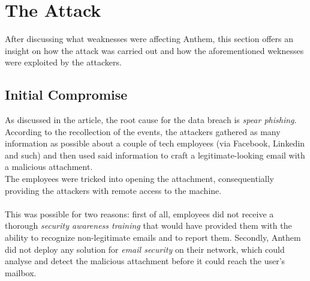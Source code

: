 \section{The Attack}
	After discussing what weaknesses were affecting Anthem, this section offers an insight on how the attack was carried out and how the aforementioned weknesses were exploited by the attackers. 
	\subsection{Initial Compromise}
	As discussed in the article, the root cause for the data breach is \textit{spear phishing}. According to the recollection of the events, the attackers gathered as many information as possible about a couple of tech employees (via Facebook, Linkedin and such) and then used said information to craft a legitimate-looking email with a malicious attachment. \\
	The employees were tricked into opening the attachment, consequentially providing the attackers with remote access to the machine.\\\\
	This was possible for two reasons: first of all, employees did not receive a thorough \textit{security awareness training} that would have provided them with the ability to recognize non-legitimate emails and to report them. Secondly, Anthem did not deploy any solution for \textit{email security} on their network, which could analyse and detect the malicious attachment before it could reach the user's mailbox.

